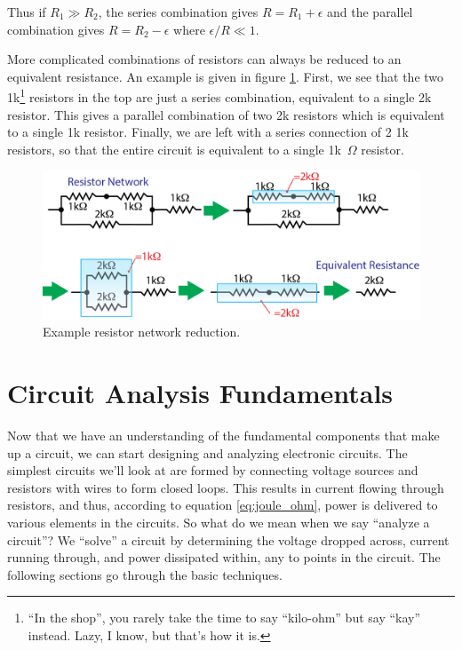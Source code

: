 \documentclass{tufte-book}
\begin{document}
\noindent Thus if $R_1\gg R_2$, the series combination gives $R = R_1 + \epsilon$ and the parallel combination gives $R = R_2-\epsilon$ where $\epsilon/R\ll1$.

More complicated combinations of resistors can always be reduced to an equivalent resistance. An example is given in figure \ref{fig:ex_resnet}. First, we see that the two 1k\footnote{``In the shop'', you rarely take the time to say ``kilo-ohm'' but say ``kay'' instead. Lazy, I know, but that's how it is.} resistors in the top are just a series combination, equivalent to a single 2k resistor. This gives a parallel combination of two 2k resistors which is equivalent to a single 1k resistor. Finally, we are left with a series connection of 2 1k resistors, so that the entire circuit is equivalent to a single 1k~$\Omega$ resistor.

\begin{figure}[h]
\caption{Example resistor network reduction.}
\label{fig:ex_resnet}
\begin{center}
\includegraphics[width=\textwidth]{ex_resnet.png}
\end{center}
\end{figure}




\chapter{Circuit Analysis Fundamentals}
Now that we have an understanding of the fundamental components that make up a circuit, we can start designing and analyzing electronic circuits. The simplest circuits we'll look at are formed by connecting voltage sources and resistors with wires to form closed loops. This results in current flowing through resistors, and thus, according to equation \ref{eq:joule_ohm}, power is delivered to various elements in the circuits. So what do we mean when we say ``analyze a circuit''? We ``solve'' a circuit by determining the voltage dropped across, current running through, and power dissipated within, any to points in the circuit. The following sections go through the basic techniques.
\end{document}

